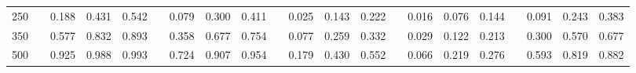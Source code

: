 % 
\begin{tabular}{ccccccccccccccccccccc}
  \hline
  \hline
250 &  & 0.188 & 0.431 & 0.542 &  & 0.079 & 0.300 & 0.411 &  & 0.025 & 0.143 & 0.222 &  & 0.016 & 0.076 & 0.144 &  & 0.091 & 0.243 & 0.383 \\ 
  350 &  & 0.577 & 0.832 & 0.893 &  & 0.358 & 0.677 & 0.754 &  & 0.077 & 0.259 & 0.332 &  & 0.029 & 0.122 & 0.213 &  & 0.300 & 0.570 & 0.677 \\ 
  500 &  & 0.925 & 0.988 & 0.993 &  & 0.724 & 0.907 & 0.954 &  & 0.179 & 0.430 & 0.552 &  & 0.066 & 0.219 & 0.276 &  & 0.593 & 0.819 & 0.882 \\ 
   \hline
\end{tabular}
